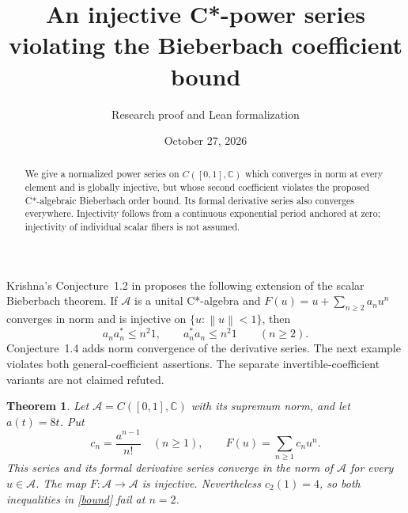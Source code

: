 \documentclass[11pt]{article}
\title{An injective C*-power series violating the Bieberbach coefficient bound}
\author{Research proof and Lean formalization}
\date{October 27, 2026}
\newtheorem{theorem}{Theorem}
\newcommand{\C}{\mathbb C}
\newcommand{\A}{\mathcal A}
\newcommand{\norm}[1]{\left\lVert#1\right\rVert}
\begin{document}
\maketitle
\begin{abstract}
We give a normalized power series on $C([0,1],\C)$ which converges in norm
at every element and is globally injective, but whose second coefficient
violates the proposed C*-algebraic Bieberbach order bound. Its formal
derivative series also converges everywhere. Injectivity follows from a
continuous exponential period anchored at zero; injectivity of individual
scalar fibers is not assumed.
\end{abstract}

Krishna's Conjecture~1.2 in \cite{Krishna} proposes the following extension
of the scalar Bieberbach theorem. If $\A$ is a unital C*-algebra and
$F(u)=u+\sum_{n\geq2}a_nu^n$ converges in norm and is injective on
$\{u:\norm u<1\}$, then
\begin{equation}\label{bound}
 a_na_n^*\leq n^2 1,\qquad a_n^*a_n\leq n^2 1\qquad(n\geq2).
\end{equation}
Conjecture~1.4 adds norm convergence of the derivative series. The next
example violates both general-coefficient assertions. The separate
invertible-coefficient variants are not claimed refuted.

\begin{theorem}\label{main}
Let $\A=C([0,1],\C)$ with its supremum norm, and let $a(t)=8t$. Put
\begin{equation}\label{series}
 c_n=\frac{a^{n-1}}{n!}\quad(n\geq1),\qquad
 F(u)=\sum_{n\geq1}c_nu^n.
\end{equation}
This series and its formal derivative series converge in the norm of $\A$
for every $u\in\A$. The map $F:\A\to\A$ is injective. Nevertheless
$c_2(1)=4$, so both inequalities in \eqref{bound} fail at $n=2$.
\end{theorem}
\end{document}
